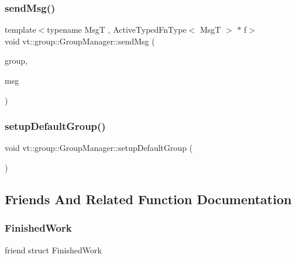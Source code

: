 \subsubsection{\texorpdfstring{send\+Msg()}{sendMsg()}}
{\footnotesize\ttfamily template$<$typename MsgT , Active\+Typed\+Fn\+Type$<$ Msg\+T $>$ $\ast$ f$>$ \\
void vt\+::group\+::\+Group\+Manager\+::send\+Msg (\begin{DoxyParamCaption}\item[{\hyperlink{namespacevt_a27b5e4411c9b6140c49100e050e2f743}{Group\+Type} const \&}]{group,  }\item[{MsgT $\ast$}]{msg }\end{DoxyParamCaption})}

\mbox{\label{structvt_1_1group_1_1_group_manager_ac0eb535f215f0edf1bed601b4338220f}} 
\subsubsection{\texorpdfstring{setup\+Default\+Group()}{setupDefaultGroup()}}
{\footnotesize\ttfamily void vt\+::group\+::\+Group\+Manager\+::setup\+Default\+Group (\begin{DoxyParamCaption}{ }\end{DoxyParamCaption})}



\subsection{Friends And Related Function Documentation}
\mbox{\label{structvt_1_1group_1_1_group_manager_ae1817e369e2c7539a02b4eeb0e5cdb83}} 
\subsubsection{\texorpdfstring{Finished\+Work}{FinishedWork}}
{\footnotesize\ttfamily friend struct Finished\+Work\hspace{0.3cm}{\ttfamily [friend]}}

